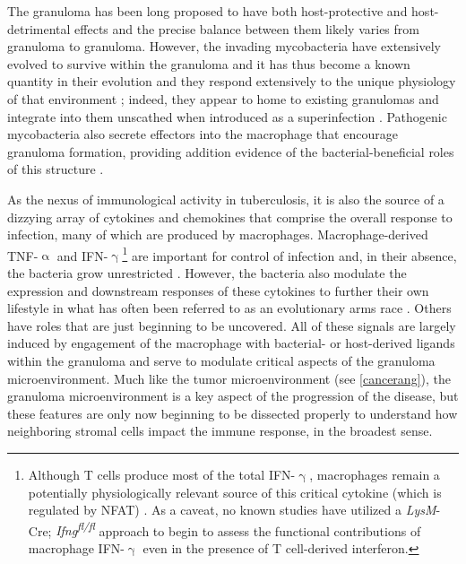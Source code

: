 The granuloma has been long proposed to have both host\hyp{}protective and host\hyp{}detrimental effects and the precise balance between them likely varies from granuloma to granuloma. However, the invading mycobacteria have extensively evolved to survive within the granuloma and it has thus become a known quantity in their evolution and they respond extensively to the unique physiology of that environment \citep{Gagneux2018, Ramakrishnan2000}; indeed, they appear to home to existing granulomas and integrate into them unscathed when introduced as a superinfection \citep{Cosma2004}. Pathogenic mycobacteria also secrete effectors into the macrophage that encourage granuloma formation, providing addition evidence of the bacterial\hyp{}beneficial roles of this structure \citep{Volkman2004, Volkman2010}. 

As the nexus of immunological activity in tuberculosis, it is also the source of a dizzying array of cytokines and chemokines that comprise the overall response to infection, many of which are produced by macrophages. Macrophage\hyp{}derived TNF\hyp{}$\upalpha$ and IFN\hyp{}$\upgamma$\footnote{Although T cells produce most of the total IFN-$\upgamma$, macrophages remain a potentially physiologically relevant source of this critical cytokine (which is regulated by NFAT) \citep{Darwich2009, Robinson2010}. As a caveat, no known studies have utilized a \textit{LysM}-Cre; \textit{Ifng\textsuperscript{fl/fl}} approach to begin to assess the functional contributions of macrophage IFN-$\upgamma$ even in the presence of T cell-derived interferon.} are important for control of infection and, in their absence, the bacteria grow unrestricted \citep{Fenton1997, Flynn1993, Flynn1995, Algood2005}. However, the bacteria also modulate the expression and downstream responses of these cytokines to further their own lifestyle in what has often been referred to as an evolutionary arms race \citep{Ting1999}. Others have roles that are just beginning to be uncovered. All of these signals are largely induced by engagement of the macrophage with bacterial\hyp{} or host\hyp{}derived ligands within the granuloma and serve to modulate critical aspects of the granuloma microenvironment. Much like the tumor microenvironment (see \autoref{cancerang}), the granuloma microenvironment is a key aspect of the progression of the disease, but these features are only now beginning to be dissected properly to understand how neighboring stromal cells impact the immune response, in the broadest sense. 

